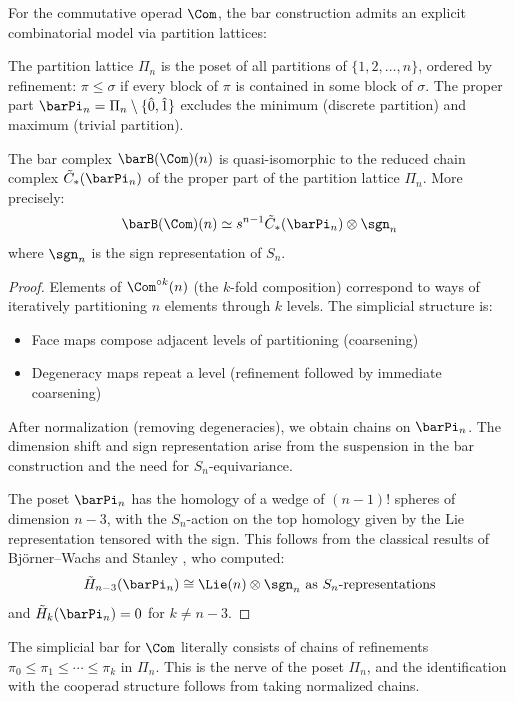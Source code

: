 For the commutative operad $\Com$, the bar construction admits an explicit combinatorial model via partition lattices:

\begin{definition}
The partition lattice $\Pi_n$ is the poset of all partitions of $\{1, 2, \ldots, n\}$, ordered by refinement: $\pi \leq \sigma$ if every block of $\pi$ is contained in some block of $\sigma$. The proper part $\barPi_n = \Pi_n \setminus \{\hat{0}, \hat{1}\}$ excludes the minimum (discrete partition) and maximum (trivial partition).
\end{definition}

\begin{theorem}\label{thm:partition}
The bar complex $\barB(\Com)(n)$ is quasi-isomorphic to the reduced chain complex $\tilde{C}_*(\barPi_n)$ of the proper part of the partition lattice $\Pi_n$. More precisely:
\[
\barB(\Com)(n) \simeq s^{n-1}\tilde{C}_{*}(\barPi_n) \otimes \sgn_n
\]
where $\sgn_n$ is the sign representation of $S_n$.
\end{theorem}

\begin{proof}
Elements of $\Com^{\circ k}(n)$ (the $k$-fold composition) correspond to ways of iteratively partitioning $n$ elements through $k$ levels. The simplicial structure is:
\begin{itemize}
\item Face maps compose adjacent levels of partitioning (coarsening)
\item Degeneracy maps repeat a level (refinement followed by immediate coarsening)
\end{itemize}

After normalization (removing degeneracies), we obtain chains on $\barPi_n$. The dimension shift and sign representation arise from the suspension in the bar construction and the need for $S_n$-equivariance.

The poset $\barPi_n$ has the homology of a wedge of $(n-1)!$ spheres of dimension $n-3$, with the $S_n$-action on the top homology given by the Lie representation tensored with the sign. This follows from the classical results of Björner--Wachs \cite{BW83} and Stanley \cite{Sta97}, who computed:
\[
\tilde{H}_{n-3}(\barPi_n) \cong \Lie(n) \otimes \sgn_n \text{ as } S_n\text{-representations}
\]
and $\tilde{H}_k(\barPi_n) = 0$ for $k \neq n-3$.
\end{proof}
\begin{remark}
The simplicial bar for $\Com$ literally consists of chains of refinements $\pi_0 \leq \pi_1 \leq \cdots \leq \pi_k$ in $\Pi_n$. This is the nerve of the poset $\Pi_n$, and the identification with the cooperad structure follows from taking normalized chains.
\end{remark}

